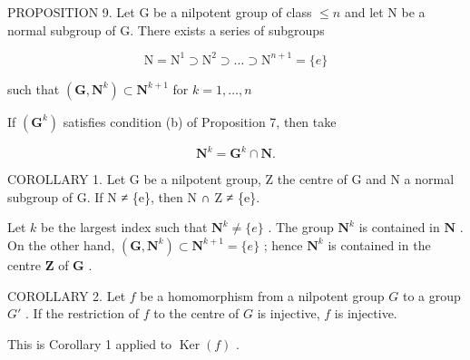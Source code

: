 PROPOSITION 9. Let G be a nilpotent group of class \(\leqslant n\) and let N be a normal subgroup of G. There exists a series of subgroups

\[
\mathrm{N} = \mathrm{N} ^ {1} \supset \mathrm{N} ^ {2} \supset \dots \supset \mathrm{N} ^ {n + 1} = \{e \}
\]

such that \((\mathbf{G},\mathbf{N}^k)\subset \mathbf{N}^{k + 1}\) for \(k = 1,\dots ,n\)

If \((\mathbf{G}^k)\) satisfies condition (b) of Proposition 7, then take

\[
\mathbf {N} ^ {k} = \mathbf {G} ^ {k} \cap \mathbf {N}.
\]

COROLLARY 1. Let G be a nilpotent group, Z the centre of G and N a normal subgroup of G. If N ≠ \{e\}, then N ∩ Z ≠ \{e\}.

Let \(k\) be the largest index such that \(\mathbf{N}^k \neq \{e\}\) . The group \(\mathbf{N}^k\) is contained in \(\mathbf{N}\) . On the other hand, \((\mathbf{G}, \mathbf{N}^k) \subset \mathbf{N}^{k+1} = \{e\}\) ; hence \(\mathbf{N}^k\) is contained in the centre \(\mathbf{Z}\) of \(\mathbf{G}\) .

COROLLARY 2. Let \(f\) be a homomorphism from a nilpotent group \(G\) to a group \(G'\) . If the restriction of \(f\) to the centre of \(G\) is injective, \(f\) is injective.

This is Corollary 1 applied to \(\operatorname{Ker}(f)\) .

